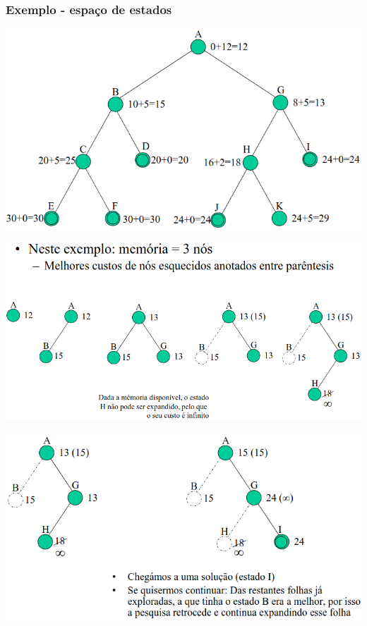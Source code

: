 \documentclass{article}
\begin{document}
\subsubsection{Exemplo - espaço de estados}

\begin{center}
  \includegraphics[scale=0.4]{62}

  \vspace{2mm}

  \includegraphics[scale=0.4]{63}

  \pagebreak

  \includegraphics[scale=0.4]{64}
\end{center}
\end{document}
